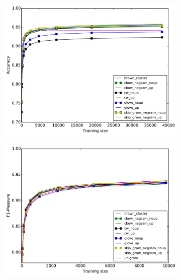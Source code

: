 \iffalse
\begin{figure}[h]
\caption{Best results for each method for POS-Tagging and Chunking}
\centering
\begin{subfigure}{6cm}
	\centering
    \includegraphics[scale=0.3]{plots/bestPOS}    	
	\label{fig:bestpos}
\end{subfigure}
\begin{subfigure}{6cm}
	\centering
    \includegraphics[scale=0.3]{plots/bestChunking}
	\label{fig:bestchunking}
\end{subfigure}
\end{figure}

